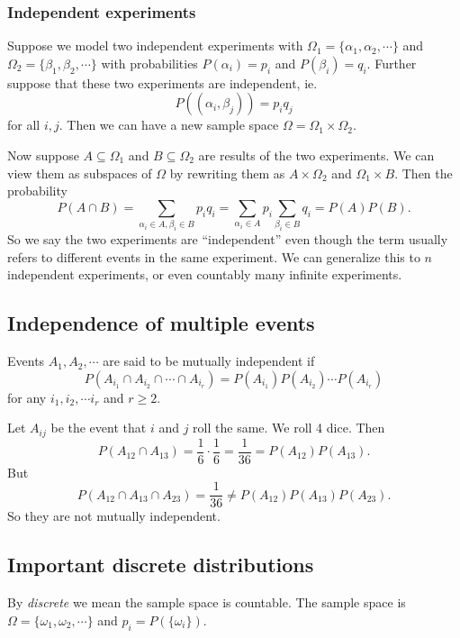 \documentclass[a4paper]{article}
\begin{document}
\subsubsection{Independent experiments}
Suppose we model two independent experiments with $\Omega_1 = \{\alpha_1, \alpha_2, \cdots\}$  and $\Omega_2 = \{\beta_1, \beta_2, \cdots\}$ with probabilities $P(\alpha_i) = p_i$ and $P(\beta_i) = q_i$. Further suppose that these two experiments are independent, ie.
\[
  P((\alpha_i, \beta_j)) = p_iq_j
\]
for all $i, j$. Then we can have a new sample space $\Omega = \Omega_1\times \Omega_2$.

Now suppose $A\subseteq \Omega_1$ and $B\subseteq \Omega_2$ are results of the two experiments. We can view them as subspaces of $\Omega$ by rewriting them as $A\times \Omega_2$ and $\Omega_1\times B$. Then the probability
\[
  P(A\cap B) = \sum_{\alpha_i\in A, \beta_i\in B} p_iq_i = \sum_{\alpha_i\in A} p_i\sum_{\beta_i\in B}q_i = P(A)P(B).
\]
So we say the two experiments are ``independent'' even though the term usually refers to different events in the same experiment. We can generalize this to $n$ independent experiments, or even countably many infinite experiments.

\subsection{Independence of multiple events}
\begin{defi}
  Events $A_1, A_2, \cdots$ are said to be mutually independent if
  \[
    P(A_{i_1}\cap A_{i_2} \cap \cdots \cap A_{i_r}) = P(A_{i_1})P(A_{i_2})\cdots P(A_{i_r})
  \]
  for any $i_1, i_2, \cdots i_r$ and $r \geq 2$.
\end{defi}
\begin{eg}
  Let $A_{ij}$ be the event that $i$ and $j$ roll the same. We roll 4 dice. Then
  \[
    P(A_{12}\cap A_{13}) = \frac{1}{6}\cdot \frac{1}{6} = \frac{1}{36} = P(A_{12})P(A_{13}).
  \]
  But
  \[
    P(A_{12}\cap A_{13}\cap A_{23}) = \frac{1}{36} \not= P(A_{12})P(A_{13})P(A_{23}).
  \]
  So they are not mutually independent.
\end{eg}
\subsection{Important discrete distributions}
By \emph{discrete} we mean the sample space is countable. The sample space is $\Omega = \{\omega_1, \omega_2, \cdots\}$ and $p_i = P(\{\omega_i\})$.
\end{document}
